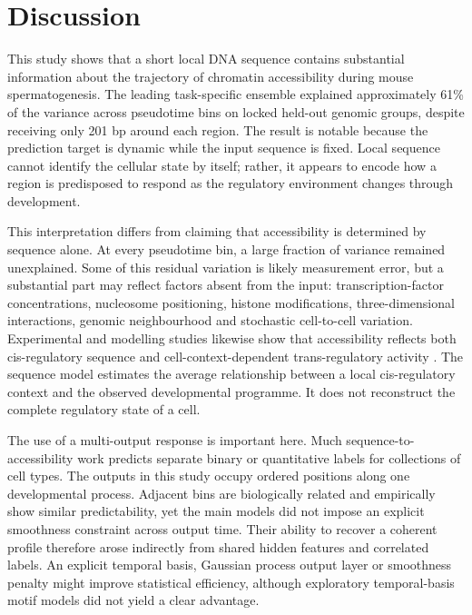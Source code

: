 \documentclass[a4paper,12pt]{article}
\begin{document}
\section{Discussion}

This study shows that a short local DNA sequence contains substantial information about the trajectory of chromatin accessibility during mouse spermatogenesis. The leading task-specific ensemble explained approximately 61\% of the variance across pseudotime bins on locked held-out genomic groups, despite receiving only 201 bp around each region. The result is notable because the prediction target is dynamic while the input sequence is fixed. Local sequence cannot identify the cellular state by itself; rather, it appears to encode how a region is predisposed to respond as the regulatory environment changes through development.

This interpretation differs from claiming that accessibility is determined by sequence alone. At every pseudotime bin, a large fraction of variance remained unexplained. Some of this residual variation is likely measurement error, but a substantial part may reflect factors absent from the input: transcription-factor concentrations, nucleosome positioning, histone modifications, three-dimensional interactions, genomic neighbourhood and stochastic cell-to-cell variation. Experimental and modelling studies likewise show that accessibility reflects both cis-regulatory sequence and cell-context-dependent trans-regulatory activity \citep{buenrostro2013atac,pampari2025chrombpnet}. The sequence model estimates the average relationship between a local cis-regulatory context and the observed developmental programme. It does not reconstruct the complete regulatory state of a cell.

The use of a multi-output response is important here. Much sequence-to-accessibility work predicts separate binary or quantitative labels for collections of cell types. The outputs in this study occupy ordered positions along one developmental process. Adjacent bins are biologically related and empirically show similar predictability, yet the main models did not impose an explicit smoothness constraint across output time. Their ability to recover a coherent profile therefore arose indirectly from shared hidden features and correlated labels. An explicit temporal basis, Gaussian process output layer or smoothness penalty might improve statistical efficiency, although exploratory temporal-basis motif models did not yield a clear advantage.
\end{document}
